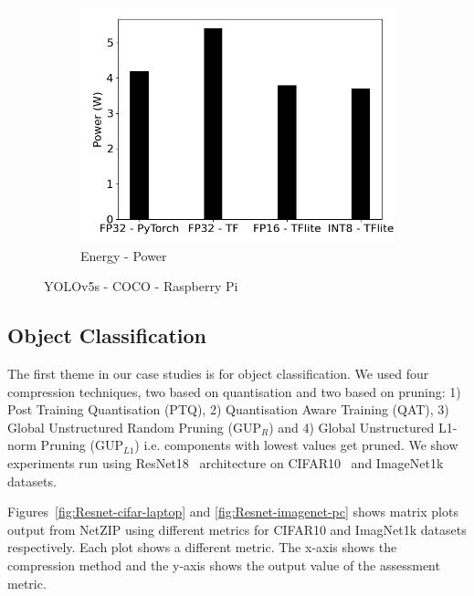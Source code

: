 \begin{figure}[]
\begin{subfigure}{0.19\textwidth}
        \includegraphics[width=1\textwidth]{other/figures/YOLOv5s_COCO_RasPi/rasPI_power_v2.png}
        \caption{Energy - Power}
    \end{subfigure}
    \caption{YOLOv5s - COCO - Raspberry Pi}
    \label{fig:yolo-coco-raspeberrypi}
\end{figure}


\subsection{Object Classification}
The first theme in our case studies is for object classification. 
%
We used four compression techniques, two based on quantisation and two based on pruning: 1) Post Training Quantisation (PTQ), 2) Quantisation Aware Training (QAT), 3)  Global Unstructured Random Pruning (GUP$_R$) and 4) Global Unstructured L1-norm Pruning (GUP$_{L1}$) i.e. components with lowest values get pruned. 
%
We show experiments run using ResNet18~\cite{he2015deep} architecture
on CIFAR10~\cite{krizhevsky2009learning}
and ImageNet1k~\cite{imagenet_cvpr09} datasets. 

Figures~\ref{fig:Resnet-cifar-laptop} and \ref{fig:Resnet-imagenet-pc} shows matrix plots output from NetZIP using different metrics for CIFAR10 and ImagNet1k datasets respectively.
%
Each plot shows a different metric. The x-axis shows the compression method and the y-axis shows the output value of the assessment metric. 

